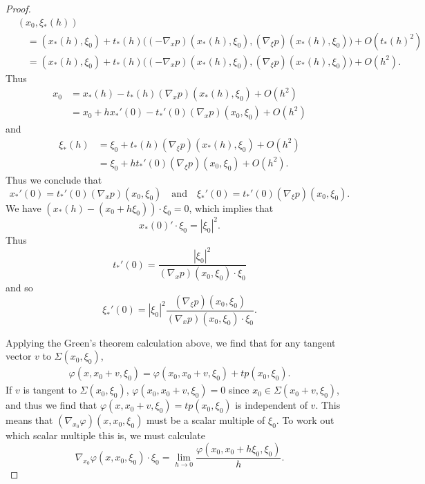 \documentclass{article}
\theoremstyle{plain}
\theoremstyle{remark}
\theoremstyle{definition}
\begin{document}
\begin{proof}
	\begin{align*}
		&(x_0, \xi_*(h))\\
		&\quad = ( x_*(h), \xi_0  ) + t_*(h) \Big( (-\nabla_x p)(x_*(h), \xi_0), (\nabla_\xi p)(x_*(h), \xi_0) \Big) + O(t_*(h)^2)\\
		&\quad = ( x_*(h), \xi_0  ) + t_*(h) \Big( (-\nabla_x p)(x_*(h), \xi_0), (\nabla_\xi p)(x_*(h), \xi_0) \Big) + O(h^2).
	\end{align*}
	Thus
	\begin{align*}
		x_0 &= x_*(h) - t_*(h) (\nabla_x p)(x_*(h), \xi_0) + O(h^2)\\
		&= x_0 + h x_*'(0) - t_*'(0) (\nabla_x p)(x_0, \xi_0) + O(h^2)
	\end{align*}
	and
	\begin{align*}
		\xi_*(h) &= \xi_0 + t_*(h) (\nabla_\xi p)(x_*(h), \xi_0) + O(h^2)\\
		&= \xi_0 + h t_*'(0) (\nabla_\xi p)(x_0, \xi_0) + O(h^2).
	\end{align*}
	Thus we conclude that
	\[ x_*'(0) = t_*'(0) (\nabla_x p)(x_0,\xi_0) \quad\text{and}\quad \xi_*'(0) = t_*'(0) (\nabla_\xi p)(x_0,\xi_0). \]
	We have $(x_*(h) - (x_0 + h \xi_0)) \cdot \xi_0 = 0$, which implies that
	\[ x_*(0)' \cdot \xi_0 = |\xi_0|^2. \]
	Thus
	\[ t_*'(0) = \frac{|\xi_0|^2}{(\nabla_x p)(x_0,\xi_0) \cdot \xi_0} \]
	and so
	\[ \xi_*'(0) = |\xi_0|^2 \frac{(\nabla_\xi p)(x_0,\xi_0)}{(\nabla_x p)(x_0, \xi_0) \cdot \xi_0}. \]

	Applying the Green's theorem calculation above, we find that for any tangent vector $v$ to $\Sigma(x_0,\xi_0)$,
	\begin{align*}
		\varphi(x,x_0 + v, \xi_0) = \varphi(x_0,x_0 + v, \xi_0) + t p(x_0,\xi_0).
	\end{align*}
	If $v$ is tangent to $\Sigma(x_0,\xi_0)$, $\varphi(x_0,x_0 + v, \xi_0) = 0$ since $x_0 \in \Sigma(x_0 + v, \xi_0)$, and thus we find that $\varphi(x,x_0 + v,\xi_0) = t p(x_0,\xi_0)$ is independent of $v$. This means that $(\nabla_{x_0} \varphi)(x,x_0,\xi_0)$ must be a scalar multiple of $\xi_0$. To work out which scalar multiple this is, we must calculate
	\[ \nabla_{x_0} \varphi(x,x_0,\xi_0) \cdot \xi_0 = \lim_{h \to 0} \frac{\varphi(x_0, x_0 + h \xi_0, \xi_0)}{h}. \]
	


\end{proof}
\end{document}
